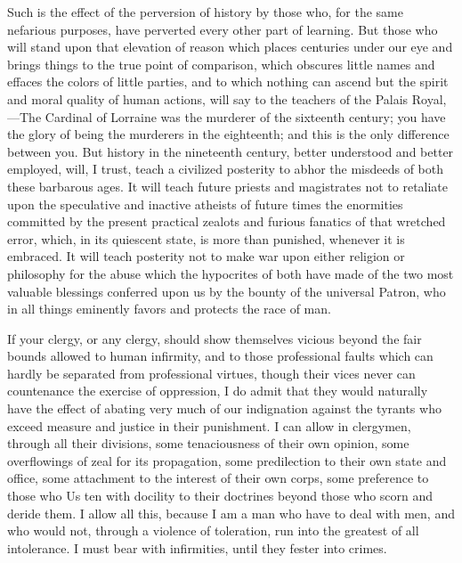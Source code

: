 Such is the effect of the perversion of history by those who, for the same nefarious purposes, have perverted every other part of learning. But those who will stand upon that elevation of reason which places centuries under our eye and brings things to the true point of comparison, which obscures little names and effaces the colors of little parties, and to which nothing can ascend but the spirit and moral quality of human actions, will say to the teachers of the Palais Royal,—The Cardinal of Lorraine was the murderer of the sixteenth century; you have the glory of being the murderers in the eighteenth; and this is the only difference between you. But history in the nineteenth century, better understood and better employed, will, I trust, teach a civilized posterity to abhor the misdeeds of both these barbarous ages. It will teach future priests and magistrates not to retaliate upon the speculative and inactive atheists of future times the enormities committed by the present practical zealots and furious fanatics of that wretched error, which, in its quiescent state, is more than punished, whenever it is embraced. It will teach posterity not to make war upon either religion or philosophy for the abuse which the hypocrites of both have made of the two most valuable blessings conferred upon us by the bounty of the universal Patron, who in all things eminently favors and protects the race of man.

If your clergy, or any clergy, should show themselves vicious beyond the fair bounds allowed to human infirmity, and to those professional faults which can hardly be separated from professional virtues, though their vices never can countenance the exercise of oppression, I do admit that they would naturally have the effect of abating very much of our indignation against the tyrants who exceed measure and justice in their punishment. I can allow in clergymen, through all their divisions, some tenaciousness of their own opinion, some overflowings of zeal for its propagation, some predilection to their own state and office, some attachment to the interest of their own corps, some preference to those who Us ten with docility to their doctrines beyond those who scorn and deride them. I allow all this, because I am a man who have to deal with men, and who would not, through a violence of toleration, run into the greatest of all intolerance. I must bear with infirmities, until they fester into crimes.

